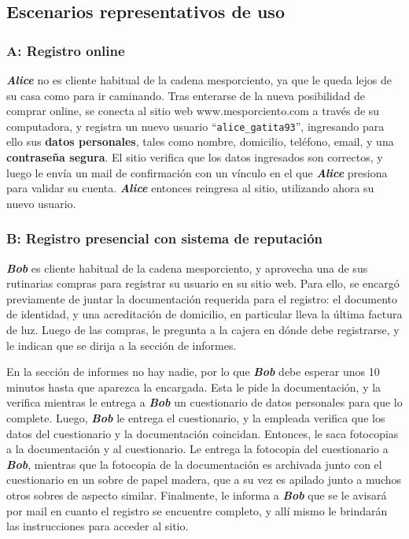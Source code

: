 \newpage
\subsection{Escenarios representativos de uso}

\subsubsection{A: Registro online}

\textbf{\emph{Alice}} no es cliente habitual de la cadena mesporciento, ya que
le queda lejos de su casa como para ir caminando. Tras enterarse de la nueva
posibilidad de comprar online, se conecta al sitio web www.mesporciento.com a
través de su computadora, y registra un nuevo usuario
``\texttt{alice\_gatita93}'', ingresando para ello sus \textbf{datos
personales}, tales como nombre, domicilio, teléfono, email, y una
\textbf{contraseña segura}. El sitio verifica que los datos ingresados son
correctos, y luego le envía un mail de confirmación con un vínculo en el que
\textbf{\emph{Alice}} presiona para validar su cuenta. \textbf{\emph{Alice}}
entonces reingresa al sitio, utilizando ahora su nuevo usuario.

\subsubsection{B: Registro presencial con sistema de reputación}

\textbf{\emph{Bob}} es cliente habitual de la cadena mesporciento, y aprovecha
una de sus rutinarias compras para registrar su usuario en su sitio web. Para
ello, se encargó previamente de juntar la documentación requerida para el
registro: el documento de identidad, y una acreditación de domicilio, en
particular lleva la última factura de luz. Luego de las compras, le pregunta a
la cajera en dónde debe registrarse, y le indican que se dirija a la sección de
informes.

En la sección de informes no hay nadie, por lo que \textbf{\emph{Bob}} debe
esperar unos 10 minutos hasta que aparezca la encargada. Esta le pide la
documentación, y la verifica mientras le entrega a \textbf{\emph{Bob}} un
cuestionario de datos personales para que lo complete. Luego,
\textbf{\emph{Bob}} le entrega el cuestionario, y la empleada verifica que los
datos del cuestionario y la documentación coincidan. Entonces, le saca
fotocopias a la documentación y al cuestionario. Le entrega la fotocopia del
cuestionario a \textbf{\emph{Bob}}, mientras que la fotocopia de la
documentación es archivada junto con el cuestionario en un sobre de papel
madera, que a su vez es apilado junto a muchos otros sobres de aspecto similar.
Finalmente, le informa a \textbf{\emph{Bob}} que se le avisará por mail en
cuanto el registro se encuentre completo, y allí mismo le brindarán las
instrucciones para acceder al sitio.

